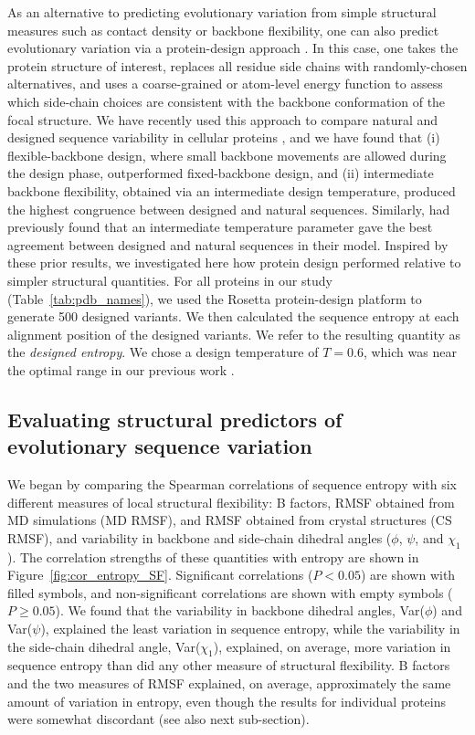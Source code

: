 \documentclass[smallextended]{svjour3}
\begin{document}
As an alternative to predicting evolutionary variation from simple structural measures such as contact density or backbone flexibility, one can also predict evolutionary variation via a protein-design approach \citep{DokholyanShakhnovich2001,OllikainenKortemme2013,Jacksonetal2013}. In this case, one takes the protein structure of interest, replaces all residue side chains with randomly-chosen alternatives, and uses a coarse-grained or atom-level energy function to assess which side-chain choices are consistent with the backbone conformation of the focal structure. We have recently used this approach to compare natural and designed sequence variability in cellular proteins  \citep{Jacksonetal2013}, and we have found that (i) flexible-backbone design, where small backbone movements are allowed during the design phase, outperformed fixed-backbone design, and (ii) intermediate backbone flexibility, obtained via an intermediate design temperature, produced the highest congruence between designed and natural sequences. Similarly, \citet{DokholyanShakhnovich2001} had previously found that an intermediate temperature parameter gave the best agreement between designed and natural sequences in their model. Inspired by these prior results, we investigated here how protein design performed relative to simpler structural quantities. For all proteins in our study (Table~\ref{tab:pdb_names}), we used the Rosetta protein-design platform \citep{LeaverFayetal2011} to generate 500 designed variants. We then calculated the sequence entropy at each alignment position of the designed variants. We refer to the resulting quantity as the \emph{designed entropy}. We chose a design temperature of $T=0.6$, which was near the optimal range in our previous work \citep{Jacksonetal2013}.

\subsection*{Evaluating structural predictors of evolutionary sequence variation}

We began by comparing the Spearman correlations of sequence entropy with six different measures of local structural flexibility: B factors, RMSF obtained from MD simulations (MD RMSF), and RMSF obtained from crystal structures (CS RMSF), and variability in backbone and side-chain dihedral angles ($\phi$, $\psi$, and $\chi_1$). The correlation strengths of these quantities with entropy are shown in Figure~\ref{fig:cor_entropy_SF}. Significant correlations ($P<0.05$) are shown with filled symbols, and non-significant correlations are shown with empty symbols ($P\geq0.05$). We found that the variability in backbone dihedral angles, Var($\phi$) and Var($\psi$), explained the least variation in sequence entropy, while the variability in the side-chain dihedral angle, Var($\chi_1$), explained, on average, more variation in sequence entropy than did any other measure of structural flexibility. B factors and the two measures of RMSF explained, on average, approximately the same amount of variation in entropy, even though the results for individual proteins were somewhat discordant (see also next sub-section).
\end{document}
